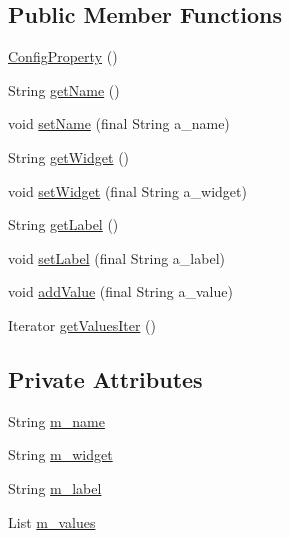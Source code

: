 \subsection*{Public Member Functions}
\begin{DoxyCompactItemize}
\item 
\hyperlink{classorg_1_1jgap_1_1data_1_1config_1_1_config_property_a739ab7f98febb9d6afffc0f1c66e14a2}{Config\-Property} ()
\item 
String \hyperlink{classorg_1_1jgap_1_1data_1_1config_1_1_config_property_a366892c8d623cc233cc3534a8366b08f}{get\-Name} ()
\item 
void \hyperlink{classorg_1_1jgap_1_1data_1_1config_1_1_config_property_a432b420eced37c099b7ce823a9d4c97d}{set\-Name} (final String a\-\_\-name)
\item 
String \hyperlink{classorg_1_1jgap_1_1data_1_1config_1_1_config_property_a5f1f93843c153d382d24abf5a4e4ca35}{get\-Widget} ()
\item 
void \hyperlink{classorg_1_1jgap_1_1data_1_1config_1_1_config_property_a8669c5751069a312963f791ee2f5bcd5}{set\-Widget} (final String a\-\_\-widget)
\item 
String \hyperlink{classorg_1_1jgap_1_1data_1_1config_1_1_config_property_a0c45ef11f210894e28be81017064fefd}{get\-Label} ()
\item 
void \hyperlink{classorg_1_1jgap_1_1data_1_1config_1_1_config_property_a03a4fcf8dae2dc8bd1fa819aa7d4dddb}{set\-Label} (final String a\-\_\-label)
\item 
void \hyperlink{classorg_1_1jgap_1_1data_1_1config_1_1_config_property_ab2f030f1de8709d702a219fdf07cc70f}{add\-Value} (final String a\-\_\-value)
\item 
Iterator \hyperlink{classorg_1_1jgap_1_1data_1_1config_1_1_config_property_a96b875c90cb5933df62b7c3561362638}{get\-Values\-Iter} ()
\end{DoxyCompactItemize}
\subsection*{Private Attributes}
\begin{DoxyCompactItemize}
\item 
String \hyperlink{classorg_1_1jgap_1_1data_1_1config_1_1_config_property_a592ac64cc363fb50c9ac09c37ac640e6}{m\-\_\-name}
\item 
String \hyperlink{classorg_1_1jgap_1_1data_1_1config_1_1_config_property_ab3fd895227566c7b3a12150e8955e753}{m\-\_\-widget}
\item 
String \hyperlink{classorg_1_1jgap_1_1data_1_1config_1_1_config_property_a2a545e9431b401be301a56134c6fcb0f}{m\-\_\-label}
\item 
List \hyperlink{classorg_1_1jgap_1_1data_1_1config_1_1_config_property_a46373b38b7e1435cb50a5678d1535eac}{m\-\_\-values}
\end{DoxyCompactItemize}

